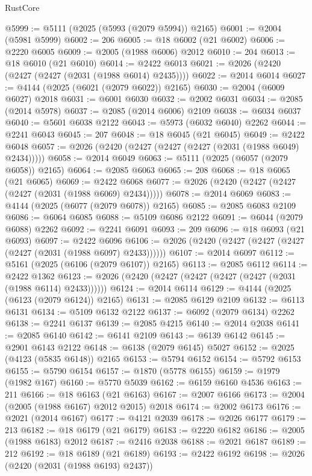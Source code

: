 \begin{lexlean}{RustCore}
\begin{coremodule}
@5999 := @5111 (@2025 (@5993 (@2079 @5994)) @2165)
@6001 := @2004 (@5981 @5999)
@6002 := 206
@6005 := @18 @6002 (@21 @6002)
@6006 := @2220 @6005
@6009 := @2005 (@1988 @6006) @2012
@6010 := 204
@6013 := @18 @6010 (@21 @6010)
@6014 := @2422 @6013
@6021 := @2026 (@2420 (@2427 (@2427 (@2031 (@1988 @6014) @2435))))
@6022 := @2014 @6014
@6027 := @4144 (@2025 (@6021 (@2079 @6022)) @2165)
@6030 := @2004 (@6009 @6027) @2018
@6031 := @6001 @6030
@6032 := @2002 @6031
@6034 := @2085 (@2014 @5978)
@6037 := @2085 (@2014 @6006) @2109
@6038 := @6034 @6037
@6040 := @5601 @6038 @2122
@6043 := @5973 (@6032 @6040) @2262
@6044 := @2241 @6043
@6045 := 207
@6048 := @18 @6045 (@21 @6045)
@6049 := @2422 @6048
@6057 := @2026 (@2420 (@2427 (@2427 (@2427 (@2031 (@1988 @6049) @2434)))))
@6058 := @2014 @6049
@6063 := @5111 (@2025 (@6057 (@2079 @6058)) @2165)
@6064 := @2085 @6063
@6065 := 208
@6068 := @18 @6065 (@21 @6065)
@6069 := @2422 @6068
@6077 := @2026 (@2420 (@2427 (@2427 (@2427 (@2031 (@1988 @6069) @2434)))))
@6078 := @2014 @6069
@6083 := @4144 (@2025 (@6077 (@2079 @6078)) @2165)
@6085 := @2085 @6083 @2109
@6086 := @6064 @6085
@6088 := @5109 @6086 @2122
@6091 := @6044 (@2079 @6088) @2262
@6092 := @2241 @6091
@6093 := 209
@6096 := @18 @6093 (@21 @6093)
@6097 := @2422 @6096
@6106 := @2026 (@2420 (@2427 (@2427 (@2427 (@2427 (@2031 (@1988 @6097) @2433))))))
@6107 := @2014 @6097
@6112 := @5161 (@2025 (@6106 (@2079 @6107)) @2165)
@6113 := @2085 @6112
@6114 := @2422 @1362
@6123 := @2026 (@2420 (@2427 (@2427 (@2427 (@2427 (@2031 (@1988 @6114) @2433))))))
@6124 := @2014 @6114
@6129 := @4144 (@2025 (@6123 (@2079 @6124)) @2165)
@6131 := @2085 @6129 @2109
@6132 := @6113 @6131
@6134 := @5109 @6132 @2122
@6137 := @6092 (@2079 @6134) @2262
@6138 := @2241 @6137
@6139 := @2085 @4215
@6140 := @2014 @2038
@6141 := @2085 @6140
@6142 := @6141 @2109
@6143 := @6139 @6142
@6145 := @2901 @6143 @2122
@6148 := @6138 (@2079 @6145) @5027
@6152 := @2025 (@4123 (@5835 @6148)) @2165
@6153 := @5794 @6152
@6154 := @5792 @6153
@6155 := @5790 @6154
@6157 := @1870 (@5778 @6155)
@6159 := @1979 (@1982 @167)
@6160 := @5770 @5039
@6162 := @6159 @6160 @4536
@6163 := 211
@6166 := @18 @6163 (@21 @6163)
@6167 := @2007 @6166
@6173 := @2004 (@2005 (@1988 @6167) @2012 @2015) @2018
@6174 := @2002 @6173
@6176 := @2021 (@2014 @6167)
@6177 := @4121 @2039
@6178 := @2026 @6177
@6179 := 213
@6182 := @18 @6179 (@21 @6179)
@6183 := @2220 @6182
@6186 := @2005 (@1988 @6183) @2012
@6187 := @2416 @2038
@6188 := @2021 @6187
@6189 := 212
@6192 := @18 @6189 (@21 @6189)
@6193 := @2422 @6192
@6198 := @2026 (@2420 (@2031 (@1988 @6193) @2437))

\end{coremodule}
\end{lexlean}
